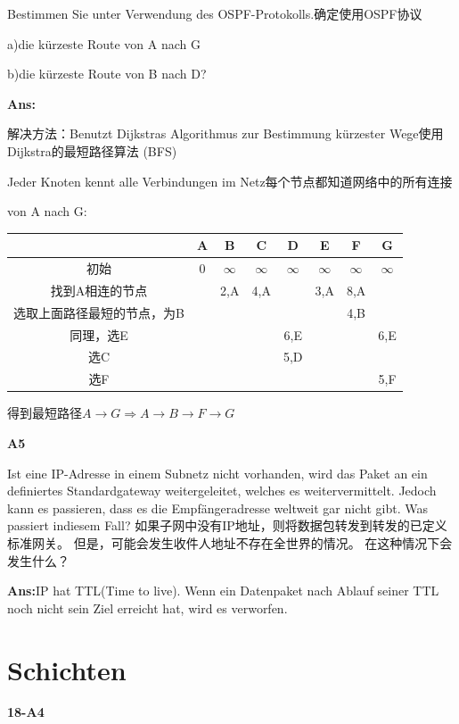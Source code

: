 \documentclass[fleqn]{article}
\begin{document}
Bestimmen Sie unter Verwendung des OSPF-Protokolls.确定使用OSPF协议

a)die kürzeste Route von A nach G

b)die kürzeste Route von B nach D?

\textbf{Ans:}

解决方法：Benutzt Dijkstras Algorithmus zur Bestimmung kürzester Wege使用Dijkstra的最短路径算法
(BFS)

Jeder Knoten kennt alle Verbindungen im Netz每个节点都知道网络中的所有连接

von A nach G:

\begin{center}
    \begin{tabular}{c|c|c|c|c|c|c|c}
        &A&B&C&D&E&F&G\\
        \hline
        初始&0&$\infty$&$\infty$&$\infty$&$\infty$&$\infty$&$\infty$\\
        \hline
        找到A相连的节点&&2,A&4,A&&3,A&8,A\\
        \hline
        选取上面路径最短的节点，为B&&&&&&4,B\\
        \hline
        同理，选E&&&&6,E&&&6,E\\
        \hline
        选C&&&&5,D&&&\\
        \hline
        选F&&&&&&&5,F
    \end{tabular}
\end{center}

得到最短路径$A\rightarrow G \Rightarrow A\rightarrow B\rightarrow F\rightarrow G$

\noindent\textbf{A5}

Ist eine IP-Adresse in einem Subnetz nicht vorhanden, wird das Paket an ein definiertes Standardgateway weitergeleitet, welches es weitervermittelt. Jedoch kann es passieren, dass es die Empfängeradresse weltweit gar nicht gibt. Was passiert indiesem Fall?
如果子网中没有IP地址，则将数据包转发到转发的已定义标准网关。 但是，可能会发生收件人地址不存在全世界的情况。 在这种情况下会发生什么？

\textbf{Ans:}IP hat TTL(Time to live). Wenn ein Datenpaket nach Ablauf seiner TTL noch nicht sein Ziel erreicht hat, wird es verworfen.

\clearpage

\section{Schichten}

\noindent\textbf{18-A4}
\end{document}
